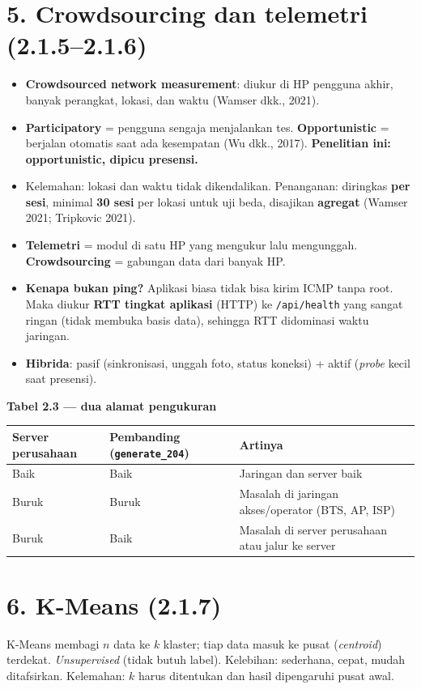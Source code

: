 \section*{5. Crowdsourcing dan telemetri (2.1.5--2.1.6)}
\begin{itemize}
  \item \textbf{Crowdsourced network measurement}: diukur di HP pengguna akhir, banyak perangkat, lokasi, dan waktu (Wamser dkk., 2021).
  \item \textbf{Participatory} = pengguna sengaja menjalankan tes. \textbf{Opportunistic} = berjalan otomatis saat ada kesempatan (Wu dkk., 2017). \textbf{Penelitian ini: opportunistic, dipicu presensi.}
  \item Kelemahan: lokasi dan waktu tidak dikendalikan. Penanganan: diringkas \textbf{per sesi}, minimal \textbf{30 sesi} per lokasi untuk uji beda, disajikan \textbf{agregat} (Wamser 2021; Tripkovic 2021).
  \item \textbf{Telemetri} = modul di satu HP yang mengukur lalu mengunggah. \textbf{Crowdsourcing} = gabungan data dari banyak HP.
  \item \textbf{Kenapa bukan ping?} Aplikasi biasa tidak bisa kirim ICMP tanpa root. Maka diukur \textbf{RTT tingkat aplikasi} (HTTP) ke \texttt{/api/health} yang sangat ringan (tidak membuka basis data), sehingga RTT didominasi waktu jaringan.
  \item \textbf{Hibrida}: pasif (sinkronisasi, unggah foto, status koneksi) + aktif (\textit{probe} kecil saat presensi).
\end{itemize}
\begin{hafal}
\textbf{Tabel 2.3 --- dua alamat pengukuran}\par
\begin{tabularx}{\linewidth}{@{}p{2.6cm}p{3.2cm}X@{}}
Server perusahaan & Pembanding (\texttt{generate\_204}) & Artinya\\
\midrule
Baik & Baik & Jaringan dan server baik\\
Buruk & Buruk & Masalah di jaringan akses/operator (BTS, AP, ISP)\\
Buruk & Baik & Masalah di server perusahaan atau jalur ke server\\
\end{tabularx}
\end{hafal}

\section*{6. K-Means (2.1.7)}
K-Means membagi $n$ data ke $k$ klaster; tiap data masuk ke pusat (\textit{centroid}) terdekat. \textit{Unsupervised} (tidak butuh label). Kelebihan: sederhana, cepat, mudah ditafsirkan. Kelemahan: $k$ harus ditentukan dan hasil dipengaruhi pusat awal.

